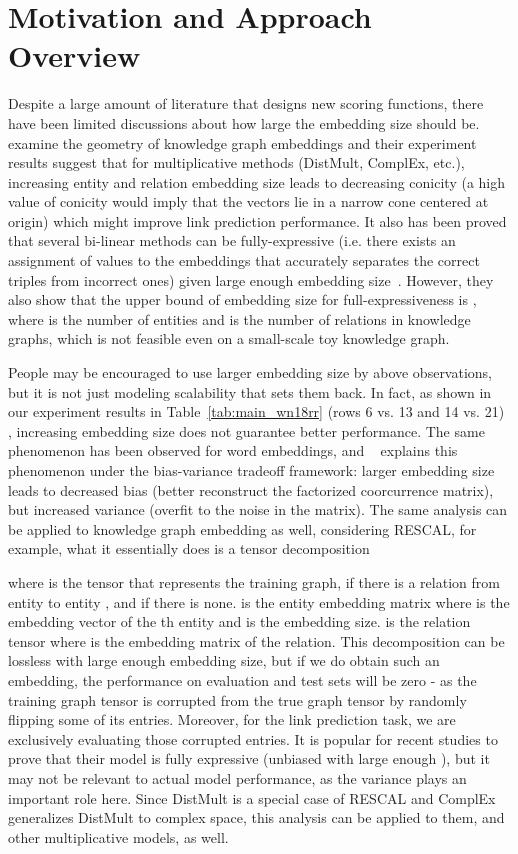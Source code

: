 \documentclass[letterpaper]{article} \usepackage{aaai20}  \usepackage{times}  \usepackage{helvet} \usepackage{courier}  \usepackage{booktabs}
\begin{document}
\section{Motivation and Approach Overview}
 

Despite a large amount of literature that designs new scoring functions, there have been limited discussions about how large the embedding size should be. \citeauthor{sharma2018towards}~ examine the geometry of knowledge graph embeddings and their experiment results suggest that for multiplicative methods (DistMult, ComplEx, etc.), increasing entity and relation embedding size leads to decreasing conicity (a high value of conicity would imply that the vectors lie in a narrow cone centered at origin) which might improve link prediction performance. 
It also has been proved that several bi-linear methods can be fully-expressive (i.e. there exists an assignment of values to the embeddings that accurately separates the correct triples from incorrect ones) given large enough embedding size~\cite{kazemi2018simple}. However, they also show that the upper bound of embedding size for full-expressiveness is , where  is the number of entities and  is the number of relations in knowledge graphs, which is not feasible even on a small-scale toy knowledge graph.

People may be encouraged to use larger embedding size by above observations, but it is not just modeling scalability that sets them back. In fact, as shown in our experiment results in Table~\ref{tab:main_wn18rr} (rows 6 vs. 13 and 14 vs. 21) , increasing embedding size does not guarantee better performance. The same phenomenon has been observed for word embeddings, and \citeauthor{yin2018dimensionality}~ explains this phenomenon under the bias-variance tradeoff framework: larger embedding size leads to decreased bias (better reconstruct the factorized coorcurrence matrix), but increased variance (overfit to the noise in the matrix). The same analysis can be applied to knowledge graph embedding as well,
considering RESCAL, for example, what it essentially does is a tensor decomposition

where  is the tensor that represents the training graph,  if there is a relation  from entity  to entity , and  if there is none.  is the entity embedding matrix where  is the embedding vector of the th entity and  is the embedding size.  is the relation tensor where  is the embedding matrix of the  relation.
This decomposition can be lossless with large enough embedding size, but if we do obtain such an embedding, the performance on evaluation and test sets will be zero - as the training graph tensor  is corrupted from the true graph tensor  by randomly flipping some of its entries. Moreover, for the link prediction task, we are exclusively evaluating those corrupted entries. It is popular for recent studies to prove that their model is fully expressive (unbiased with large enough ), but it may not be relevant to actual model performance, as the variance plays an important role here. Since DistMult is a special case of RESCAL and ComplEx generalizes DistMult to complex space, this analysis can be applied to them, and other multiplicative models, as well.
\end{document}
